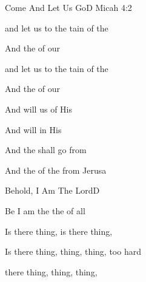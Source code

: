 \documentclass[a5paper,11pt]{book}
\newcommand{\RevDate}{\today}
\newcommand{\NotCCLIed}{\relax}
\begin{document}
\begin{song}{Come And Let Us Go}{D}
  {}
  {}
  {Micah 4:2}
  {\NotCCLIed}

  \renewcommand{\RevDate}{February~11,~1993}

  \begin{SBOpGroup}
     and let us  to the tain of the 
    
    And  the  of our 
    
     and let us  to the tain of the 
    
    And  the  of our 
    
    And  will  us of His  
    
    And  will  in His  
    
    And the  shall go  from 
    
    And the  of the  from Jerusa
  \end{SBOpGroup}
\end{song}


\begin{song}{Behold, I Am The Lord}{D}
  {}
  {}
  {}
  {\NotCCLIed}

  \renewcommand{\RevDate}{February~11,~1993}

  \begin{SBOpGroup}
    Be I am the  the  of all 
    
    Is there thing, is there thing,    
    
    Is there thing, thing, thing, too hard  
    
     there thing, thing, thing,    
  \end{SBOpGroup}
\end{song}
\end{document}
